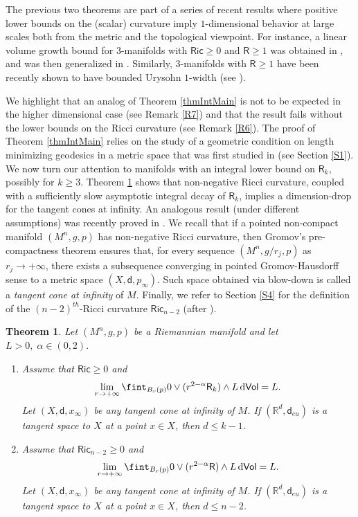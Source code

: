 \documentclass[10pt]{article}
\newtheorem{thm}{Theorem}[section]
\theoremstyle{definition}
\newcommand{\bb}[1]{\mathbb{#1}}
\newcommand{\ssf}[1]{\mathsf{#1}}
\newcommand{\Ric}{\mathsf{Ric}}
\newcommand{\sd}{\mathsf{d}}
\newcommand{\R}{\mathsf{R}}
\newcommand{\de}{{\rm d}}
\begin{document}
        The previous two theorems are part of a series of recent results where positive lower bounds on the (scalar) curvature imply $1$-dimensional behavior at large scales both from the metric and the topological viewpoint. For instance, a linear volume growth bound for $3$-manifolds with $\Ric \geq 0 $ and $\R \geq 1$ was obtained in \cite{wangvolumethreemanifolds}, and was then generalized in \cite{ Chodoshvolumethreemanifolds, antonelli2024newspectralbishopgromovbonnetmyers, zhou2024optimalvolumeboundvolume}. Similarly, $3$-manifolds with $\R \geq 1$ have been recently shown to have bounded Urysohn $1$-width (see \cite{Katzscalar,GromovScalar,Liokumovitchscalar,liokumovitchwang}).
        
       We highlight that an analog of Theorem \ref{thmIntMain} is not to be expected in the higher dimensional case (see Remark \ref{R7}) and that the result fails without the lower bounds on the Ricci curvature (see Remark \ref{R6}). The proof of Theorem \ref{thmIntMain} relies on the study of a geometric condition on length minimizing geodesics in a metric space that was first studied in \cite{TrianglesKapo} (see Section \ref{S1}).
\\

We now turn our attention to manifolds with an integral lower bound on $\R_k$, possibly for $k \geq 3$.
Theorem \ref{thmInt3} shows that non-negative Ricci curvature, coupled with a sufficiently slow asymptotic integral decay of $\R_k$, implies a dimension-drop for the tangent cones at infinity. An analogous result (under different assumptions) was recently proved in \cite[Theorem 1.6]{zhu2024twodimensionvanishingsplittingpositive}.
We recall that if a pointed non-compact manifold $(M^n,g,p)$ has non-negative Ricci curvature, then Gromov's pre-compactness theorem ensures that, for every sequence $(M^n,g/r_j,p)$ as $r_j \to + \infty$,  there exists a subsequence converging in pointed Gromov-Hausdorff sense to a metric space $(X,\sd,p_\infty)$. Such  space obtained via blow-down is called a \emph{tangent cone at infinity} of $M$. 
Finally, we refer to Section \ref{S4} for the definition of the $(n-2)^{th}$-Ricci curvature $\Ric_{n-2}$ (after \cite{ShenKricci}).

\begin{thm} \label{thmInt3}
    Let $(M^n,g,p)$ be a Riemannian manifold and let $L>0, \;\alpha \in (0,2)$.
    \begin{enumerate}
        \item
        Assume that $\Ric \geq 0$ and
    \[
    \lim_{r \to + \infty} \fint_{B_r(p)} 0 \vee (r^{2-\alpha}\R_k) \wedge L \,\de\ssf{Vol}=L.
    \]
    Let $(X,\sd,x_\infty)$ be any tangent cone at infinity of $M$. 
    If $(\bb{R}^d,\sd_{eu})$ is a tangent space to $X$ at a point $x \in X$, then $d \leq k-1$. 
    \item 
    Assume that $\Ric_{n-2} \geq 0$ and
    \[
    \lim_{r \to + \infty} \fint_{B_r(p)} 0 \vee (r^{2-\alpha}\R) \wedge L \,\de\ssf{Vol}=L.
    \]
    Let $(X,\sd,x_\infty)$ be any tangent cone at infinity of $M$. 
    If $(\bb{R}^d,\sd_{eu})$ is a tangent space to $X$ at a point $x \in X$, then $d \leq n-2$.
    \end{enumerate}
    \end{thm}
\end{document}
